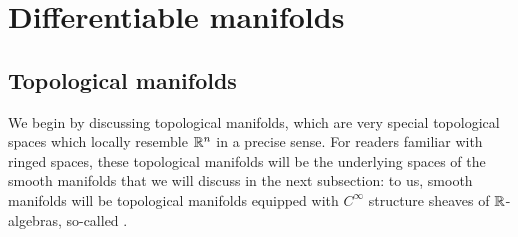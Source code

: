 \section{Differentiable manifolds}
    \subsection{Topological manifolds}
        We begin by discussing topological manifolds, which are very special topological spaces which locally resemble $\mathbb{R}^n$ in a precise sense. For readers familiar with ringed spaces, these topological manifolds will be the underlying spaces of the smooth manifolds that we will discuss in the next subsection: to us, smooth manifolds will be topological manifolds equipped with $C^{\infty}$ structure sheaves of $\mathbb{R}$-algebras, so-called .
    
